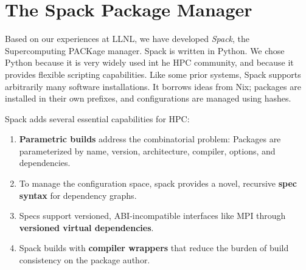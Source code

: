
\section{The Spack Package Manager}
\label{sec:implementation}
Based on our experiences at LLNL, we have developed
{\it Spack}, the Supercomputing PACKage manager.
Spack is written in Python.  We chose Python because it is
very widely used int he HPC community, and because it provides
flexible scripting capabilities. 
%
Like some prior systems, Spack supports arbitrarily many software installations.
It borrows ideas from Nix; packages are installed in their own prefixes,
and configurations are managed using hashes.

\noindent
Spack adds several essential capabilities for HPC:
\begin{enumerate}
\item {\bf Parametric builds} address the combinatorial problem:
      Packages are parameterized by name, version, architecture, compiler, 
      options, and dependencies.
\item To manage the configuration space, spack provides a novel, 
      recursive {\bf spec syntax} for dependency graphs.
\item Specs support versioned, ABI-incompatible interfaces like MPI through
      {\bf versioned virtual dependencies}.
\item Spack builds with {\bf compiler wrappers} that reduce the burden of build
      consistency on the package author.
\end{enumerate}











